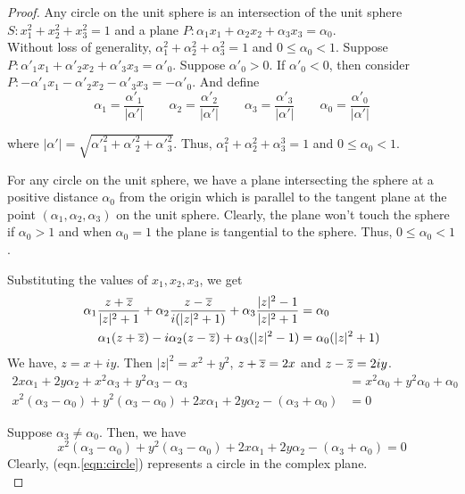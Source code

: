 \begin{proof}
	Any circle on the unit sphere is an intersection of 
	the unit sphere $S : x_1^2+x_2^2+x_3^2=1$ and
	a plane $P : \alpha_1x_1+\alpha_2x_2+ \alpha_3x_3 = \alpha_0$.\\

	Without loss of generality, $\alpha_1^2+\alpha_2^2+\alpha_3^2 = 1$ and $0 \le \alpha_0 < 1$.
	Suppose $P : \alpha'_1 x_1 + \alpha'_2 x_2 + \alpha'_3 x_3 = \alpha'_0$.
	Suppose $\alpha'_0 > 0$.
	If $\alpha'_0 < 0$, then consider $P : -\alpha'_1 x_1 - \alpha'_2 x_2 - \alpha'_3 x_3 = -\alpha'_0$.
	And define
	\[ 
	\alpha_1 = \frac{\alpha'_1}{|\alpha'|} \qquad
	\alpha_2 = \frac{\alpha'_2}{|\alpha'|} \qquad
	\alpha_3 = \frac{\alpha'_3}{|\alpha'|} \qquad
	\alpha_0 = \frac{\alpha'_0}{|\alpha'|}\] 

	where $|\alpha'| = \sqrt{{\alpha'}_1^2 + {\alpha'}_2^2 + {\alpha'}_3^2}$.
	Thus, $\alpha_1^2 + \alpha_2^2+\alpha_3^3 = 1$ and $0 \le \alpha_0 < 1$.\\

\begin{commentary}
	For any circle on the unit sphere, we have a plane intersecting the sphere at a positive distance $\alpha_0$ from the origin which is parallel to the tangent plane at the point $(\alpha_1,\alpha_2,\alpha_3)$ on the unit sphere.
	Clearly, the plane won't touch the sphere if $\alpha_0 > 1$ and when $\alpha_0 = 1$ the plane is tangential to the sphere.
	Thus, $0 \le \alpha_0 < 1$.\\
\end{commentary}

	\noindent Substituting the values of $x_1,x_2,x_3$, we get
	\begin{align*}
		\alpha_1 \frac{z+\overline{z}}{|z|^2+1} + \alpha_2 \frac{z - \overline{z}}{i(|z|^2+1)} + \alpha_3 \frac{|z|^2-1}{|z|^2+1} & = \alpha_0 \\
		\alpha_1 (z+\overline{z}) - i\alpha_2 (z - \overline{z}) + \alpha_3 (|z|^2-1) & = \alpha_0 (|z|^2+1)
	\end{align*}
		We have, $z = x+iy$.
		Then $|z|^2 = x^2+y^2$, $z+\overline{z} = 2x$ and $z - \overline{z} = 2iy$.
	\begin{align*}
		2x\alpha_1 + 2y\alpha_2 + x^2\alpha_3 + y^2\alpha_3-\alpha_3 & = x^2\alpha_0 + y^2 \alpha_0+\alpha_0 \\
		x^2(\alpha_3-\alpha_0) + y^2(\alpha_3-\alpha_0) + 2x\alpha_1 + 2y\alpha_2-(\alpha_3+\alpha_0) &= 0
	\end{align*}
	
	Suppose $\alpha_3 \ne \alpha_0$.
	Then, we have 
	\begin{equation}
		x^2(\alpha_3-\alpha_0)+y^2(\alpha_3-\alpha_0) + 2x\alpha_1 + 2y\alpha_2 - (\alpha_3+\alpha_0) = 0
		\label{eqn:circle}
	\end{equation}
	Clearly, (eqn.\ref{eqn:circle}) represents a circle in the complex plane.\\


\end{proof}
